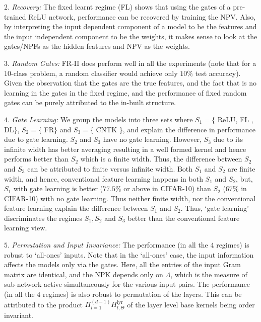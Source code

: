 \indent\quad $2.$ \emph{Recovery:} The fixed learnt regime  (FL) shows that using the gates of a pre-trained ReLU network, performance can be recovered by training the NPV. Also, by interpreting the input dependent component of a model to be the features and the input independent component to be the weights, it makes sense to look at the gates/NPFs as the hidden features and NPV as the weights.%

\indent\quad $3.$ \emph{Random Gates:} FR-II does perform well in all the experiments (note that for a $10$-class problem, a random classifier would achieve only $10\%$ test accuracy). Given the observation that the gates are the true features, and the fact that is no learning in the gates in the fixed regime, and the performance of fixed random gates can be purely attributed to the in-built structure.

\indent\quad $4.$ \emph{Gate Learning:} We group the models into three sets where $S_1=\{$ ReLU, FL , DL$\}$, $S_2=\{$ FR$\}$ and $S_3=\{$ CNTK $\}$, and explain the difference in performance due to gate learning.
 $S_2$ and $S_3$ have no gate learning. However,  $S_3$ due to its infinite width has better averaging resulting in a well formed kernel and hence performs better than $S_2$ which is a finite width. Thus, the difference between $S_2$ and $S_3$ can be attributed to finite versus infinite width. Both $S_1$ and $S_2$ are finite width, and hence, conventional feature learning happens in both $S_1$ and $S_2$, but, $S_1$ with gate learning is better ($77.5\%$ or above in CIFAR-10) than $S_2$ ($67\%$ in CIFAR-10) with no gate learning. Thus neither finite width, nor the conventional feature learning explain the difference between $S_1$ and $S_2$. Thus, `gate learning' discriminates the regimes $S_1, S_2$ and $S_3$ better than the conventional feature learning view.

\indent\quad $5.$ \emph{Permutation and Input Invariance:} The performance (in all the $4$ regimes) is  robust to `all-ones' inputs. Note that in the `all-ones' case, the input information affects the models only via the gates. Here, all the entries of the input Gram matrix are identical, and the NPK depends only on $\Lambda$, which is the measure of sub-network active simultaneously for the various input pairs. The performance (in all the $4$ regimes) is also robust to permutation of the layers. This can be attributed to the product $\Pi_{l=1}^{(d-1)} H^{\text{lyr}}_{l,\Theta}$ of the layer level base kernels being order invariant.

